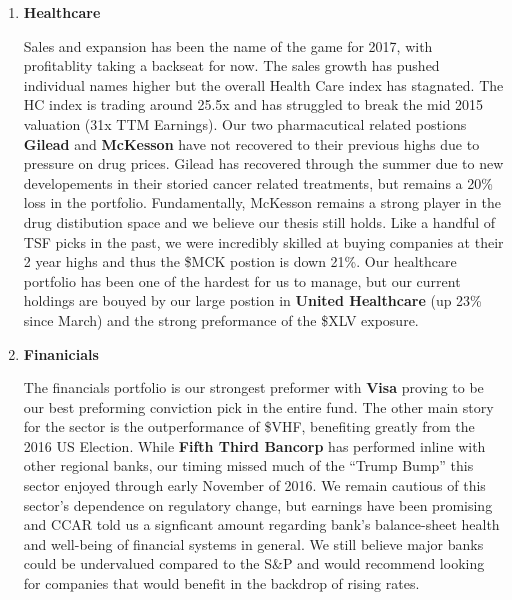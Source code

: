 \documentclass[11pt,pressrelease]{newlfm} %
\begin{document}
\begin{newlfm}
\begin{singlespace}
\begin{enumerate}
\item \textbf{Healthcare} \par
Sales and expansion has been the name of the game for 2017, with profitablity taking a backseat for now. The sales growth has pushed individual names higher but the overall Health Care index has stagnated. The HC index is trading around 25.5x and has struggled to break the mid 2015 valuation (31x TTM Earnings). Our two pharmacutical related postions \textbf{Gilead} and \textbf{McKesson} have not recovered to their previous highs due to pressure on drug prices. Gilead has recovered through the summer due to new developements in their storied cancer related treatments, but remains a 20\% loss in the portfolio. Fundamentally, McKesson remains a strong player in the drug distibution space and we believe our thesis still holds. Like a handful of TSF picks in the past, we were incredibly skilled at buying companies at their 2 year highs and thus the \$MCK postion is down 21\%. Our healthcare portfolio has been one of the hardest for us to manage, but our current holdings are bouyed by our large postion in \textbf{United Healthcare} (up 23\% since March) and the strong preformance of the \$XLV exposure.

\item \textbf{Finanicials} \par
The financials portfolio is our strongest preformer with \textbf{Visa} proving to be our best preforming conviction pick in the entire fund. The other main story for the sector is the outperformance of \$VHF, benefiting greatly from the 2016  US Election. While \textbf{Fifth Third Bancorp} has performed inline with other regional banks, our timing missed much of the ``Trump Bump'' this sector enjoyed through early November of 2016. We remain cautious of this sector's dependence on regulatory change, but earnings have been promising and CCAR told us a signficant amount regarding bank's balance-sheet health and well-being of financial systems in general. We still believe major banks could be undervalued compared to the S\&P and would recommend looking for companies that would benefit in the backdrop of rising rates.


\end{enumerate}
\end{singlespace}
\end{newlfm}
\end{document}
